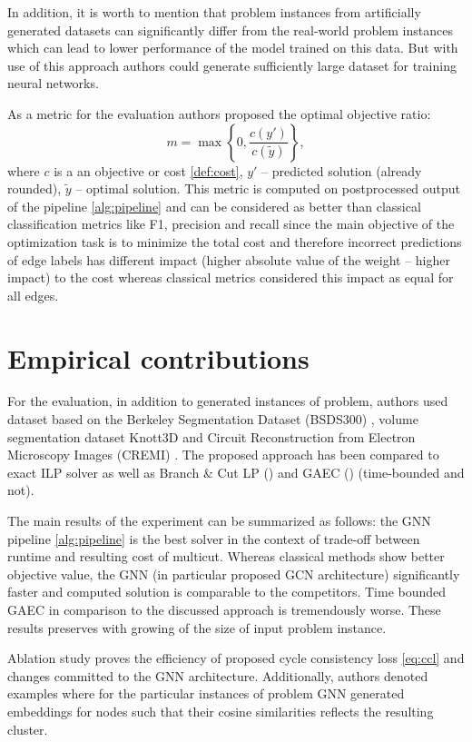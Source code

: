 \documentclass[10pt, twocolumn, a4paper]{article}
\theoremstyle{definition}
\begin{document}
In addition, it is worth to mention that problem instances from artificially generated datasets can
significantly differ from the real-world problem instances which can lead to lower performance of the model
trained on this data. But with use of this approach authors could generate sufficiently large
dataset for training neural networks.

As a metric for the evaluation authors proposed the optimal objective ratio:
\[
    m = \max \left\{ 0, \frac{c(y')}{c(\tilde{y})} \right\},
\]
where $c$ is a an objective or cost \eqref{def:cost}, $y'$ -- predicted solution (already rounded),
$\tilde{y}$ -- optimal solution. This metric is computed on postprocessed output of the
pipeline \ref{alg:pipeline} and can be considered as better than classical classification
metrics like F1, precision and recall since the main objective of the optimization task is to
minimize the total cost and therefore incorrect predictions of edge labels has different impact (higher absolute value
of the weight -- higher impact) to the cost whereas classical metrics considered this impact as
equal for all edges.

\section{Empirical contributions} \label{sec:empirical_contib}

For the evaluation, in addition to generated instances of problem, authors used
dataset \citet{andres2011probabilistic} based on the Berkeley Segmentation Dataset (BSDS300) \citet{martin2001database},
volume segmentation dataset Knott3D \citet{andres2012globally} and
Circuit Reconstruction from Electron Microscopy Images (CREMI) \citet{beier2017multicut}.
The proposed approach has been compared to exact ILP solver as well as Branch \& Cut LP (\citet{kappes2015comparative})
and GAEC (\citet{keuper2015efficient}) (time-bounded and not).

The main results of the experiment can be summarized as follows: the GNN pipeline \ref{alg:pipeline}
is the best solver in the context of trade-off between runtime and resulting cost of multicut. Whereas
classical methods show better objective value, the GNN (in particular proposed GCN architecture)
significantly faster and computed solution is comparable to the competitors. Time bounded GAEC in comparison
to the discussed approach is tremendously worse. These results preserves with growing of the size of
input problem instance.

Ablation study proves the efficiency of proposed cycle consistency loss \eqref{eq:ccl} and changes committed to
the GNN architecture. Additionally, authors denoted examples where for the particular instances of problem
GNN generated embeddings for nodes such that their cosine similarities reflects the resulting cluster.
\end{document}
